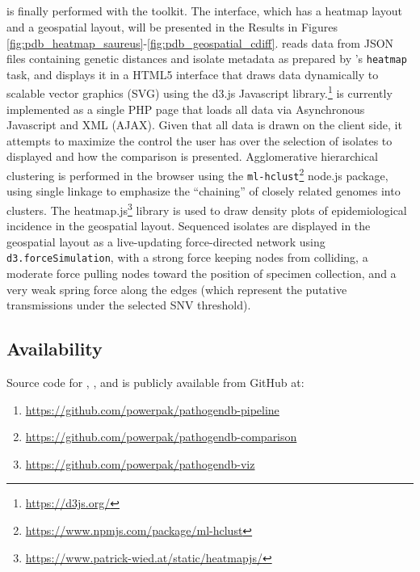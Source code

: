 \subsection{\pathogendbviz}

 is finally performed with the \pathogendbviz{} toolkit. The interface, which has a heatmap layout and a geospatial layout, will be presented in the Results in Figures \ref{fig:pdb_heatmap_saureus}-\ref{fig:pdb_geospatial_cdiff}. \pathogendbviz{} reads data from JSON files containing genetic distances and isolate metadata as prepared by \pathogendbcomparison{}'s \verb|heatmap| task, and displays it in a HTML5 interface that draws data dynamically to scalable vector graphics (SVG) using the d3.js Javascript library.\footnote{\url{https://d3js.org/}} \pathogendbviz{} is currently implemented as a single PHP page that loads all data via Asynchronous Javascript and XML (AJAX).\autocite{Paulson2005} Given that all data is drawn on the client side, it attempts to maximize the control the user has over the selection of isolates to displayed and how the comparison is presented. Agglomerative hierarchical clustering is performed in the browser using the \texttt{ml-hclust}\footnote{\url{https://www.npmjs.com/package/ml-hclust}} node.js package, using single linkage to emphasize the ``chaining'' of closely related genomes into clusters. The heatmap.js\footnote{\url{https://www.patrick-wied.at/static/heatmapjs/}} library is used to draw density plots of epidemiological incidence in the geospatial layout. Sequenced isolates are displayed in the geospatial layout as a live-updating force-directed network using \texttt{d3.forceSimulation}, with a strong force keeping nodes from colliding, a moderate force pulling nodes toward the position of specimen collection, and a very weak spring force along the edges (which represent the putative transmissions under the selected SNV threshold).

\subsection{Availability}

Source code for \pathogendbpipeline, \pathogendbcomparison, and \pathogendbviz{} is publicly available from GitHub at:

\begin{enumerate}[label=\arabic*.,noitemsep,labelindent=2em,leftmargin=!]
\item \url{https://github.com/powerpak/pathogendb-pipeline}
\item \url{https://github.com/powerpak/pathogendb-comparison}
\item \url{https://github.com/powerpak/pathogendb-viz}
\end{enumerate}

